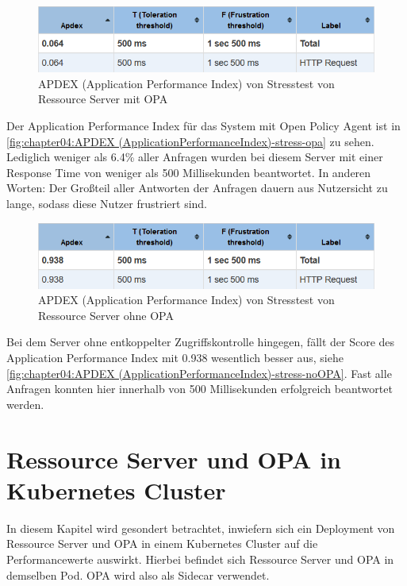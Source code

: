 \begin{figure}[H]
  \centering
  \includegraphics[width=1.0\textwidth]{gfx/APDEX (Application Performance Index)-stress-opa.png}
  \caption{APDEX (Application Performance Index) von Stresstest von Ressource Server mit OPA}
  \label{fig:chapter04:APDEX (ApplicationPerformanceIndex)-stress-opa}
\end{figure}

Der Application Performance Index für das System mit Open Policy Agent ist in \autoref{fig:chapter04:APDEX (ApplicationPerformanceIndex)-stress-opa} zu sehen. Lediglich weniger als 6.4\% aller Anfragen wurden bei diesem Server mit einer Response Time von weniger als 500 Millisekunden beantwortet. In anderen Worten: Der Großteil aller Antworten der Anfragen dauern aus Nutzersicht zu lange, sodass diese Nutzer frustriert sind.

\begin{figure}[H]
  \centering
  \includegraphics[width=1.0\textwidth]{gfx/APDEX (Application Performance Index)-stress-noOPA.png}
  \caption{APDEX (Application Performance Index) von Stresstest von Ressource Server ohne OPA}
  \label{fig:chapter04:APDEX (ApplicationPerformanceIndex)-stress-noOPA}
\end{figure}

Bei dem Server ohne entkoppelter Zugriffskontrolle hingegen, fällt der Score des Application Performance Index mit 0.938 wesentlich besser aus, siehe \autoref{fig:chapter04:APDEX (ApplicationPerformanceIndex)-stress-noOPA}. Fast alle Anfragen konnten hier innerhalb von 500 Millisekunden erfolgreich beantwortet werden. 

\section{Ressource Server und OPA in Kubernetes Cluster}

In diesem Kapitel wird gesondert betrachtet, inwiefern sich ein Deployment von Ressource Server und OPA in einem Kubernetes Cluster auf die Performancewerte auswirkt. Hierbei befindet sich Ressource Server und OPA in demselben Pod. OPA wird also als Sidecar verwendet. 

